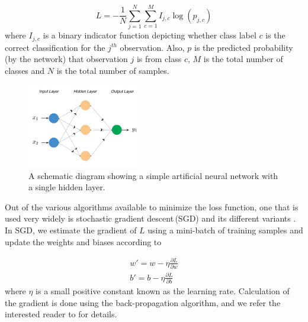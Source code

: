 \documentclass[twocolumn]{aastex63}
\begin{document}
\begin{equation}
L = -\frac{1}{N}\sum_{j=1}^N \sum_{c=1}^M I_{j,c} \log(p_{j,c}) 
\label{eq:cross_entr_loss}
\end{equation}
where $I_{j,c}$ is a binary indicator function depicting whether class label $c$ is the correct classification for the $j^{th}$ observation. Also, $p$ is the predicted probability (by the network) that observation $j$ is from class $c$, $M$ is the total number of classes and $N$ is the total number of samples. 

\begin{figure}[htbp]
	\begin{center}
		\includegraphics[width=0.45\textwidth]{schematic_toy_network.pdf}
	\end{center}
	\caption{A schematic diagram showing a simple artificial neural network with a single hidden layer.}
	\label{fig:schematic_network}
\end{figure}

Out of the various algorithms available to minimize the loss function, one that is used very widely is stochastic gradient descent\,(SGD) and its different variants \citep{nielsen}. In SGD, we estimate the gradient of $L$ using a mini-batch of training samples and update the weights and biases according to

\begin{equation}
\begin{aligned}
w' = w -\eta \frac{\partial L}{\partial w} \\
b' = b - \eta \frac{\partial L}{\partial b}
\end{aligned}
\label{eq:sgd}
\end{equation}
where $\eta$ is a small positive constant known as the learning rate. Calculation of the gradient is done using the back-propagation algorithm, and we refer the interested reader to \citet{rumelhart_88} for details.
\end{document}
